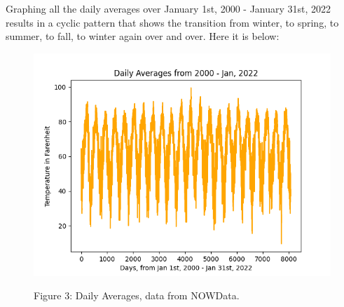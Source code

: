 Graphing all the daily averages over January 1st, 2000 - January 31st, 2022 results in a cyclic pattern that shows the transition from winter, to spring, to summer, to fall, to winter again over and over. Here it is below:

\begin{figure}[h!]
\centering
\includegraphics[scale=0.8]{Averages.png}
\label{Figure 3: Daily Averages}
\caption{Figure 3: Daily Averages, data from NOWData.}
\end{figure}
\FloatBarrier
